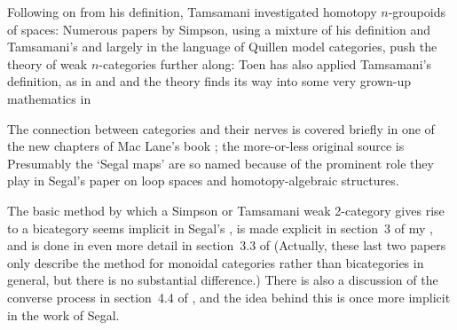 Following on from his definition, Tamsamani investigated homotopy
$n$-gr\-ou\-poids of spaces:
% 
%
% 
Numerous papers by Simpson, using a mixture of his definition and Tamsamani's
and largely in the language of Quillen model categories, push the theory of
weak $n$-categories further along:
% 
%
% 
% 
%
% 
% 
%
% 
% 
%
% 
Toen has also applied Tamsamani's definition, as in
% 
%
% 
and
% 
%
% 
and the theory finds its way into some very grown-up mathematics in
% 
%
% 

The connection between categories and their nerves is covered briefly in one
of the new chapters of Mac Lane's book ; the more-or-less
original source is
% 
%
% 
Presumably the `Segal maps' are so named because of the prominent role they
play in Segal's paper  on loop spaces and homotopy-algebraic
structures.

The basic method by which a Simpson or Tamsamani weak 2-category gives rise
to a bicategory seems implicit in Segal's , is made explicit in
section~3 of my , and is done in even more detail in section~3.3
of
% 
%
% 
(Actually, these last two papers only describe the method for monoidal
categories rather than bicategories in general, but there is no substantial
difference.)  There is also a discussion of the converse process in
section~4.4 of , and the idea behind this is once more implicit in
the work of Segal.




